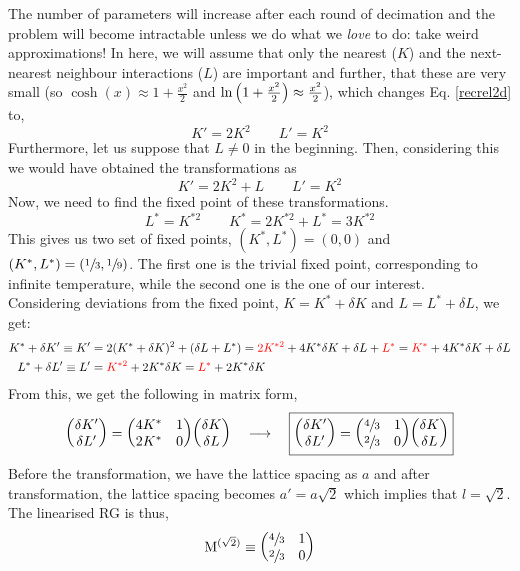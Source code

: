 The number of parameters will increase after each round of decimation and the problem will become intractable unless we do what we \textit{love} to do: take weird approximations! In here, we will assume that only the nearest ($K$) and the next-nearest neighbour interactions ($L$) are important and further, that these are very small (so $\cosh(x)\approx 1 +\frac{x^2}{2}$ and $\ln \qty(1 +\frac{x^2}{2})\approx \frac{x^2}{2}$), which changes Eq. \eqref{recrel2d} to,
$$K' = 2K^2\qquad L' = K^2$$
Furthermore, let us suppose that $L\neq 0$ in the beginning. Then, considering this we would have obtained the transformations as $$K'= 2K^2 + L \qquad L'=K^2$$ 
Now, we need to find the fixed point of these transformations.
$$L^* = K^{*2}\qquad K^*=2K^{*2}+L^* = 3K^{*2}$$
This gives us two set of fixed points, $(K^*,L^*) = (0,0)$ and $(K^*,L^*) = (\sfrac{1}{3},\sfrac{1}{9})$. The first one is the trivial fixed point, corresponding to infinite temperature, while the second one is the one of our interest.\\[0.2cm]
Considering deviations from the fixed point, $K = K^*+\delta K$ and $L=L^*+\delta L$, we get:
\begin{align*}
   K^*+\delta K' \equiv  K' &= 2(K^*+\delta K)^2 + (\delta L + L^*) = \mathcolor{red}{2K^{*2}} + 4K^*\delta K +\delta L + \mathcolor{red}{L^*} = \mathcolor{red}{K^*}+4K^*\delta K+\delta L\\
   L^*+\delta L' \equiv L' &= \mathcolor{red}{K^{*2}} + 2K^* \delta K = \mathcolor{red}{L^*}+2K^* \delta K
\end{align*}
From this, we get the following in matrix form, 
\begin{equation}
    \mqty(\delta K' \\ \delta L') = \mqty( 4K^* & 1 \\ 2K^* & 0 ) \mqty(\delta K \\ \delta L)\quad \longrightarrow\quad \boxed{\mqty(\delta K' \\ \delta L') =\mqty( \sfrac{4}{3} & 1 \\ \sfrac{2}{3} & 0 ) \mqty(\delta K \\ \delta L)}
\end{equation}
Before the transformation, we have the lattice spacing as $a$ and after transformation, the lattice spacing becomes $a'= a\sqrt{2}$ which implies that $l=\sqrt{2}$. The linearised RG is thus, 
$$\mathrm{M}^{(\sqrt{2})} \equiv \mqty( \sfrac{4}{3} & 1 \\ \sfrac{2}{3} & 0 ) $$
